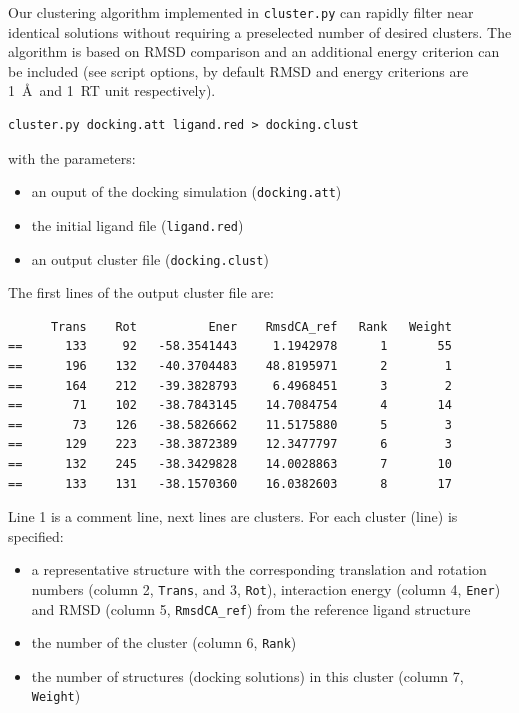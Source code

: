 \documentclass[12pt,a4paper]{article}
\begin{document}
Our clustering algorithm implemented in {\tt cluster.py} can rapidly filter near identical solutions 
without requiring a preselected number of desired clusters.
The algorithm is based on RMSD comparison and an additional energy criterion can be included 
(see script options, by default RMSD and energy criterions are 1~\AA\ and 1~RT unit respectively).

\begin{verbatim}
cluster.py docking.att ligand.red > docking.clust
\end{verbatim}

with the parameters:
\begin{itemize}
\item an ouput of the docking simulation ({\tt docking.att})
\item the initial ligand file ({\tt ligand.red})
\item an output cluster file ({\tt docking.clust})
\end{itemize}

The first lines of the output cluster file are:

\linenumbers*
\begin{verbatim}
      Trans    Rot          Ener    RmsdCA_ref   Rank   Weight
==      133     92   -58.3541443     1.1942978      1       55
==      196    132   -40.3704483    48.8195971      2        1
==      164    212   -39.3828793     6.4968451      3        2
==       71    102   -38.7843145    14.7084754      4       14
==       73    126   -38.5826662    11.5175880      5        3
==      129    223   -38.3872389    12.3477797      6        3
==      132    245   -38.3429828    14.0028863      7       10
==      133    131   -38.1570360    16.0382603      8       17
\end{verbatim}
\nolinenumbers

Line 1 is a comment line, next lines are clusters. For each cluster (line)
is specified:
\begin{itemize}
\item a representative structure with the corresponding translation and rotation
numbers (column 2, {\tt Trans}, and 3, {\tt Rot}), interaction energy 
(column 4, {\tt Ener}) and RMSD (column 5, {\tt RmsdCA\_ref}) 
from the reference ligand structure
\item the number of the cluster (column 6, {\tt Rank})
\item the number of structures (docking solutions) in this cluster (column
7, {\tt Weight})
\end{itemize}
\end{document}
